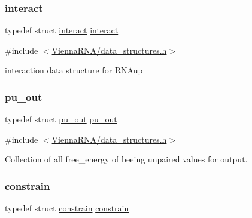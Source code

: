 \subsubsection{\texorpdfstring{interact}{interact}}
{\footnotesize\ttfamily typedef struct \mbox{\hyperlink{group__data__structures_structinteract}{interact}}  \mbox{\hyperlink{group__data__structures_structinteract}{interact}}}



{\ttfamily \#include $<$\mbox{\hyperlink{data__structures_8h}{Vienna\+R\+N\+A/data\+\_\+structures.\+h}}$>$}



interaction data structure for R\+N\+Aup 

\mbox{\label{group__data__structures_ga501763bd204b60f40e3ab68b40023023}} 
\subsubsection{\texorpdfstring{pu\+\_\+out}{pu\_out}}
{\footnotesize\ttfamily typedef struct \mbox{\hyperlink{group__data__structures_structpu__out}{pu\+\_\+out}}  \mbox{\hyperlink{group__data__structures_structpu__out}{pu\+\_\+out}}}



{\ttfamily \#include $<$\mbox{\hyperlink{data__structures_8h}{Vienna\+R\+N\+A/data\+\_\+structures.\+h}}$>$}



Collection of all free\+\_\+energy of beeing unpaired values for output. 

\mbox{\label{group__data__structures_ga212e3afb0cc299acdfb1ec976435686e}} 
\subsubsection{\texorpdfstring{constrain}{constrain}}
{\footnotesize\ttfamily typedef struct \mbox{\hyperlink{group__data__structures_structconstrain}{constrain}}  \mbox{\hyperlink{group__data__structures_structconstrain}{constrain}}}



